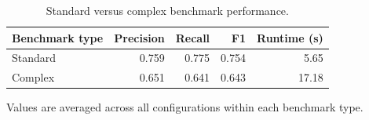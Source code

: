 \begin{table}[htbp]
\centering
\small
\caption{Standard versus complex benchmark performance.}
\label{tab:standard-complex-overview}
\begin{tabular}{lrrrr}
\toprule
Benchmark type & Precision & Recall & F1 & Runtime (s) \\
\midrule
Standard & 0.759 & 0.775 & 0.754 & 5.65 \\
Complex & 0.651 & 0.641 & 0.643 & 17.18 \\
\bottomrule
\end{tabular}
\par\footnotesize{Values are averaged across all configurations within each benchmark type.}
\end{table}
